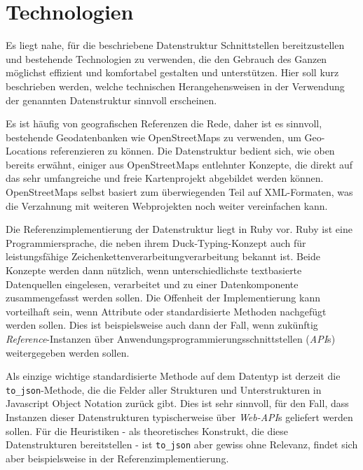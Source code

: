 \section{Technologien}
\label{technologies}
Es liegt nahe, für die beschriebene Datenstruktur Schnittstellen bereitzustellen und bestehende Technologien zu verwenden, die den Gebrauch des Ganzen möglichst effizient und komfortabel gestalten und unterstützen. Hier soll kurz beschrieben werden, welche technischen Herangehensweisen in der Verwendung der genannten Datenstruktur sinnvoll erscheinen.

Es ist häufig von geografischen Referenzen die Rede, daher ist es sinnvoll, bestehende Geodatenbanken wie OpenStreetMaps zu verwenden, um Geo-Locations referenzieren zu können. Die Datenstruktur bedient sich, wie oben bereits erwähnt, einiger aus OpenStreetMaps entlehnter Konzepte, die direkt auf das sehr umfangreiche und freie Kartenprojekt abgebildet werden können. OpenStreetMaps selbst basiert zum überwiegenden Teil auf XML-Formaten, was die Verzahnung mit weiteren Webprojekten noch weiter vereinfachen kann.

Die Referenzimplementierung der Datenstruktur liegt in Ruby vor\cite{georeferencegem}. Ruby ist eine Programmiersprache, die neben ihrem Duck-Typing-Konzept auch für leistungsfähige Zeichenkettenverarbeitungverarbeitung bekannt ist. Beide Konzepte werden dann nützlich, wenn unterschiedlichste textbasierte Datenquellen eingelesen, verarbeitet und zu einer Datenkomponente zusammengefasst werden sollen. Die Offenheit der Implementierung kann vorteilhaft sein, wenn Attribute oder standardisierte Methoden nachgefügt werden sollen. Dies ist beispielsweise auch dann der Fall, wenn zukünftig \textit{Reference}-Instanzen über Anwendungsprogrammierungsschnittstellen (\textit{API}s) weitergegeben werden sollen.

Als einzige wichtige standardisierte Methode auf dem Datentyp ist derzeit die \texttt{to\_json}-Methode, die die Felder aller Strukturen und Unterstrukturen in Javascript Object Notation\cite{jsonspec} zurück gibt. Dies ist sehr sinnvoll, für den Fall, dass Instanzen dieser Datenstrukturen typischerweise über \textit{Web-API}s geliefert werden sollen. Für die Heuristiken - als theoretisches Konstrukt, die diese Datenstrukturen bereitstellen - ist \texttt{to\_json} aber gewiss ohne Relevanz, findet sich aber beispielsweise in der Referenzimplementierung.
